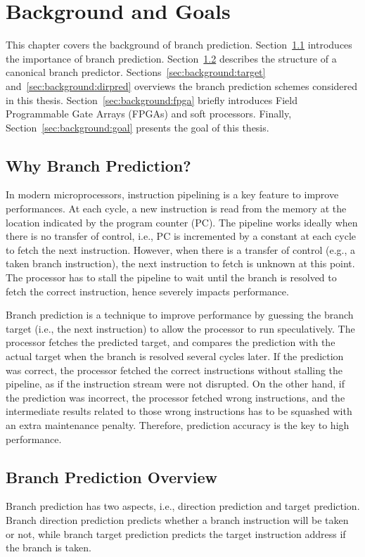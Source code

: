 \chapter{Background and Goals}
\label{chap:background}
This chapter covers the background of branch prediction. Section~\ref{sec:background:whybp} introduces the importance of branch prediction. Section~\ref{sec:background:bpoverview} describes the structure of a canonical branch predictor. Sections~\ref{sec:background:target} and~\ref{sec:background:dirpred} overviews the branch prediction schemes considered in this thesis. Section~\ref{sec:background:fpga} briefly introduces Field Programmable Gate Arrays (FPGAs) and soft processors. Finally, Section~\ref{sec:background:goal} presents the goal of this thesis. 

\section{Why Branch Prediction?}
\label{sec:background:whybp}
In modern microprocessors, instruction pipelining is a key feature to improve performances. At each cycle, a new instruction is read from the memory at the location indicated by the program counter (PC). The pipeline works ideally when there is no transfer of control, i.e., PC is incremented by a constant at each cycle to fetch the next instruction. However, when there is a transfer of control (e.g., a taken branch instruction), the next instruction to fetch is unknown at this point. The processor has to stall the pipeline to wait until the branch is resolved to fetch the correct instruction, hence severely impacts performance.

Branch prediction is a technique to improve performance by guessing the branch target (i.e., the next instruction) to allow the processor to run speculatively. The processor fetches the predicted target, and compares the prediction with the actual target when the branch is resolved several cycles later. If the prediction was correct, the processor fetched the correct instructions without stalling the pipeline, as if the instruction stream were not disrupted. On the other hand, if the prediction was incorrect, the processor fetched wrong instructions, and the intermediate results related to those wrong instructions has to be squashed with an extra maintenance penalty. Therefore, prediction accuracy is the key to high performance.

\section{Branch Prediction Overview}
\label{sec:background:bpoverview}
Branch prediction has two aspects, i.e., direction prediction and target prediction. Branch direction prediction predicts whether a branch instruction will be taken or not, while branch target prediction predicts the target instruction address if the branch is taken.

